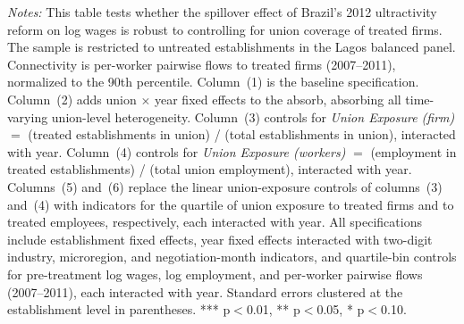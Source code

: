 \begin{table}[]
\begin{threeparttable}
\begin{tablenotes}
\item \textit{Notes:} This table tests whether the spillover effect of Brazil's 2012 ultractivity reform on log wages is robust to controlling for union coverage of treated firms. The sample is restricted to untreated establishments in the Lagos balanced panel. Connectivity is per-worker pairwise flows to treated firms (2007--2011), normalized to the 90th percentile. Column~(1) is the baseline specification. Column~(2) adds union $\times$ year fixed effects to the absorb, absorbing all time-varying union-level heterogeneity. Column~(3) controls for \textit{Union Exposure (firm)} $=$ (treated establishments in union) / (total establishments in union), interacted with year. Column~(4) controls for \textit{Union Exposure (workers)} $=$ (employment in treated establishments) / (total union employment), interacted with year. Columns~(5) and~(6) replace the linear union-exposure controls of columns~(3) and~(4) with indicators for the quartile of union exposure to treated firms and to treated employees, respectively, each interacted with year. All specifications include establishment fixed effects, year fixed effects interacted with two-digit industry, microregion, and negotiation-month indicators, and quartile-bin controls for pre-treatment log wages, log employment, and per-worker pairwise flows (2007--2011), each interacted with year. Standard errors clustered at the establishment level in parentheses. *** p$<$0.01, ** p$<$0.05, * p$<$0.10.
\end{tablenotes}
\end{threeparttable}
\end{table}